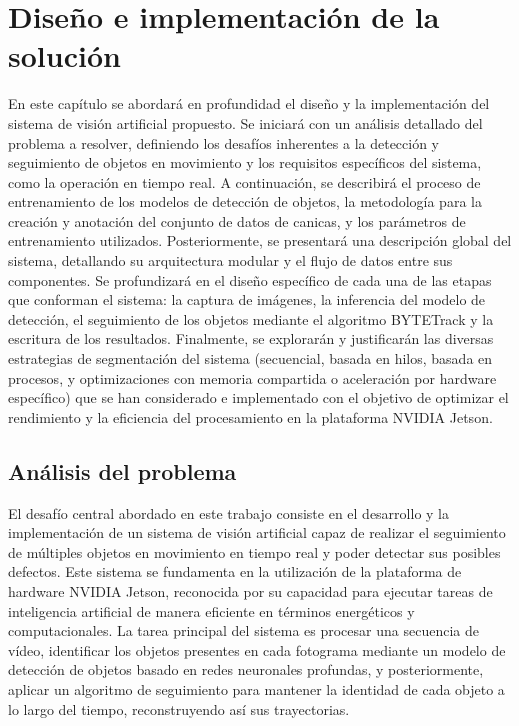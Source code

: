 \documentclass[11pt,spanish,listoffigures,listoftables]{tfgetsinf}
\begin{document}




\chapter{Diseño e implementación de la solución}\label{chap:diseno_e_implementacion}

En este capítulo se abordará en profundidad el diseño y la implementación del sistema de visión artificial propuesto. Se iniciará con un análisis detallado del problema a resolver, definiendo los desafíos inherentes a la detección y seguimiento de objetos en movimiento y los requisitos específicos del sistema, como la operación en tiempo real. A continuación, se describirá el proceso de entrenamiento de los modelos de detección de objetos, la metodología para la creación y anotación del conjunto de datos de canicas, y los parámetros de entrenamiento utilizados. Posteriormente, se presentará una descripción global del sistema, detallando su arquitectura modular y el flujo de datos entre sus componentes. Se profundizará en el diseño específico de cada una de las etapas que conforman el sistema: la captura de imágenes, la inferencia del modelo de detección, el seguimiento de los objetos mediante el algoritmo BYTETrack y la escritura de los resultados. Finalmente, se explorarán y justificarán las diversas estrategias de segmentación del sistema (secuencial, basada en hilos, basada en procesos, y optimizaciones con memoria compartida o aceleración por hardware específico) que se han considerado e implementado con el objetivo de optimizar el rendimiento y la eficiencia del procesamiento en la plataforma NVIDIA Jetson.



\section{Análisis del problema}\label{sec:analisis_problema}

El desafío central abordado en este trabajo consiste en el desarrollo y la implementación de un sistema de visión artificial capaz de realizar el seguimiento de múltiples objetos en movimiento en tiempo real y poder detectar sus posibles defectos. Este sistema se fundamenta en la utilización de la plataforma de hardware NVIDIA Jetson, reconocida por su capacidad para ejecutar tareas de inteligencia artificial de manera eficiente en términos energéticos y computacionales. La tarea principal del sistema es procesar una secuencia de vídeo, identificar los objetos presentes en cada fotograma mediante un modelo de detección de objetos basado en redes neuronales profundas, y posteriormente, aplicar un algoritmo de seguimiento para mantener la identidad de cada objeto a lo largo del tiempo, reconstruyendo así sus trayectorias.
\end{document}
